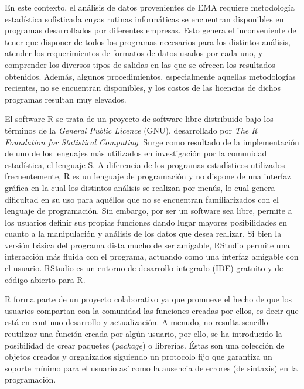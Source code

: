 En este contexto, el análisis de datos provenientes de EMA requiere metodología estadística sofisticada cuyas rutinas informáticas se encuentran disponibles en programas desarrollados por diferentes empresas. Esto genera el inconveniente de tener que disponer de todos los programas necesarios para los distintos análisis, atender los requerimientos de formatos de datos usados por cada uno, y comprender los diversos tipos de salidas en las que se ofrecen los resultados obtenidos. Además, algunos procedimientos, especialmente aquellas metodologías recientes, no se encuentran disponibles, y los costos de las licencias de dichos programas resultan muy elevados. 

El software R se trata de un proyecto de software libre distribuido bajo los términos de la \emph{General Public Licence} (GNU), desarrollado por \emph{The R Foundation for Statistical Computing}. Surge como resultado de la implementación de uno de los lenguajes más utilizados en investigación por la comunidad estadística, el lenguaje S. A diferencia de los programas estadísticos utilizados frecuentemente, R es un lenguaje de programación y no dispone de una interfaz gráfica en la cual los distintos análisis se realizan por menús, lo cual genera dificultad en su uso para aquéllos que no se encuentran familiarizados con el lenguaje de programación. Sin embargo,  por ser un software sea libre,  permite a los usuarios definir sus propias funciones dando lugar mayores posibilidades en cuanto a la manipulación y análisis de los datos que desea realizar. Si bien la versión básica del programa dista mucho de ser amigable, RStudio permite una interacción más fluida con el programa, actuando como una interfaz amigable con el usuario.  RStudio es un entorno de desarrollo integrado (IDE) gratuito y de código abierto para R. 

R forma parte de un proyecto colaborativo ya que promueve el hecho de que los usuarios compartan con la comunidad las funciones creadas por ellos, es decir que está en continuo desarrollo y actualización. A menudo, no resulta sencillo reutilizar una función creada por algún usuario, por ello, se ha introducido la posibilidad de crear paquetes (\emph{package}) o librerías. Éstas son una colección de objetos creados y organizados siguiendo un protocolo fijo que garantiza un soporte mínimo para el usuario así como la ausencia de errores (de sintaxis) en la programación.

